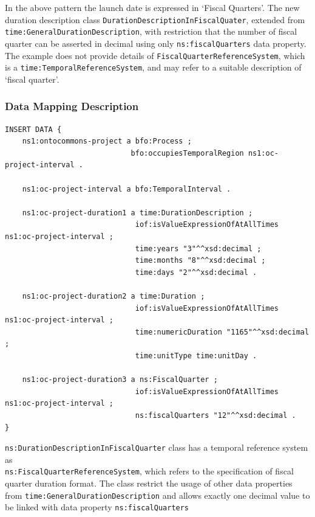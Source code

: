 In the above pattern the launch date is expressed in `Fiscal Quarters'. The new duration description class \texttt{DurationDescriptionInFiscalQuater}, extended from \texttt{time:GeneralDurationDescription}, with restriction that the number of fiscal quarter can be asserted in decimal using only \texttt{ns:fiscalQuarters} data property. The example does not provide details of \texttt{FiscalQuarterReferenceSystem}, which is a \texttt{time:TemporalReferenceSystem}, and may refer to a suitable description of `fiscal quarter'. 


\subsubsection*{Data Mapping Description}

\begin{verbatim}
INSERT DATA {
    ns1:ontocommons-project a bfo:Process ;
                             bfo:occupiesTemporalRegion ns1:oc-project-interval .

    ns1:oc-project-interval a bfo:TemporalInterval .

    ns1:oc-project-duration1 a time:DurationDescription ;
                              iof:isValueExpressionOfAtAllTimes ns1:oc-project-interval ;
                              time:years "3"^^xsd:decimal ;
                              time:months "8"^^xsd:decimal ;
                              time:days "2"^^xsd:decimal .

    ns1:oc-project-duration2 a time:Duration ;
                              iof:isValueExpressionOfAtAllTimes ns1:oc-project-interval ;
                              time:numericDuration "1165"^^xsd:decimal ;
                              time:unitType time:unitDay .

    ns1:oc-project-duration3 a ns:FiscalQuarter ;
                              iof:isValueExpressionOfAtAllTimes ns1:oc-project-interval ;
                              ns:fiscalQuarters "12"^^xsd:decimal .
}
\end{verbatim}

\texttt{ns:DurationDescriptionInFiscalQuarter} class has a temporal reference system as \\ \texttt{ns:FiscalQuarterReferenceSystem}, which refers to the specification of fiscal quarter duration format. The class restrict the usage of other data properties from \texttt{time:GeneralDurationDescription} and allows exactly one decimal value to be linked with data property \texttt{ns:fiscalQuarters}

